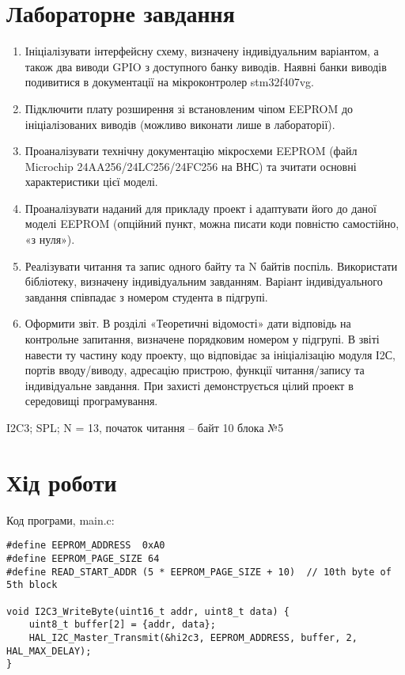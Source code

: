 \documentclass[oneside,14pt]{extarticle}
\begin{document}
\begin{normalsize}
  \section*{Лабораторне завдання}
  \begin{enumerate}
  	\item Ініціалізувати інтерфейсну схему, визначену індивідуальним варіантом, а
також два виводи GPIO з доступного банку виводів. Наявні банки виводів
подивитися в документації на мікроконтролер stm32f407vg.
  \item Підключити плату розширення зі встановленим чіпом EEPROM до
ініціалізованих виводів (можливо виконати лише в лабораторії).
  \item Проаналізувати технічну документацію мікросхеми EEPROM (файл
Microchip 24AA256/24LC256/24FC256 на ВНС) та зчитати основні
характеристики цієї моделі.
  \item Проаналізувати наданий для прикладу проект і адаптувати його до даної
моделі EEPROM (опційний пункт, можна писати коди повністю
самостійно, «з нуля»).
  \item Реалізувати читання та запис одного байту та N байтів поспіль.
Використати бібліотеку, визначену індивідуальним завданням. Варіант
індивідуального завдання співпадає з номером студента в підгрупі.
  \item Оформити звіт. В розділі «Теоретичні відомості» дати відповідь на
контрольне запитання, визначене порядковим номером у підгрупі. В звіті
навести ту частину коду проекту, що відповідає за ініціалізацію модуля
І2С, портів вводу/виводу, адресацію пристрою, функції читання/запису та
індивідуальне завдання. При захисті демонструється цілий проект в
середовищі програмування.
  \end{enumerate}
  
  I2C3; SPL; N = 13, початок читання – байт 10 блока №5
  
  \section*{Хід роботи}
  
  Код програми, main.c:
  
	{\small\begin{lstlisting}
#define EEPROM_ADDRESS  0xA0
#define EEPROM_PAGE_SIZE 64
#define READ_START_ADDR (5 * EEPROM_PAGE_SIZE + 10)  // 10th byte of 5th block

void I2C3_WriteByte(uint16_t addr, uint8_t data) {
    uint8_t buffer[2] = {addr, data};
    HAL_I2C_Master_Transmit(&hi2c3, EEPROM_ADDRESS, buffer, 2, HAL_MAX_DELAY);
}


\end{lstlisting}}
\end{normalsize}
\end{document}
